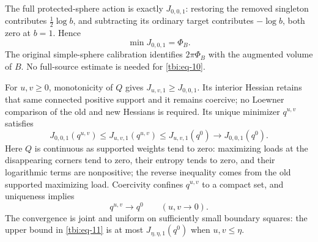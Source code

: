The full protected-sphere action is exactly \(J_{0,0,1}\): restoring the removed singleton contributes \(\frac12\log b\), and subtracting its ordinary target contributes \(-\log b\), both zero at \(b=1\). Hence
\begin{equation}\label{tbi:eq-10}
\min J_{0,0,1}=\Phi_B.
\end{equation}
The original simple-sphere calibration identifies \(2\pi\Phi_B\) with the augmented volume of \(B\). No full-source estimate is needed for \eqref{tbi:eq-10}.

For \(u,v\ge0\), monotonicity of \(Q\) gives \(J_{u,v,1}\ge J_{0,0,1}\). Its interior Hessian retains that same connected positive support and it remains coercive; no Loewner comparison of the old and new Hessians is required. Its unique minimizer \(q^{u,v}\) satisfies
\begin{equation}\label{tbi:eq-11}
J_{0,0,1}(q^{u,v})
\le J_{u,v,1}(q^{u,v})
\le J_{u,v,1}(q^0)\longrightarrow J_{0,0,1}(q^0).
\end{equation}
Here \(Q\) is continuous as supported weights tend to zero: maximizing loads at the disappearing corners tend to zero, their entropy tends to zero, and their logarithmic terms are nonpositive; the reverse inequality comes from the old supported maximizing load. Coercivity confines \(q^{u,v}\) to a compact set, and uniqueness implies
\begin{equation}\label{tbi:eq-12}
q^{u,v}\longrightarrow q^0\qquad(u,v\to0).
\end{equation}
The convergence is joint and uniform on sufficiently small boundary squares: the upper bound in \eqref{tbi:eq-11} is at most \(J_{\eta,\eta,1}(q^0)\) when \(u,v\le\eta\).

